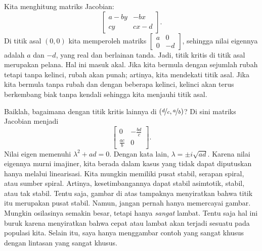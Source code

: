 Kita menghitung matriks Jacobian:
\begin{equation*}
\begin{bmatrix}
a-by & -bx \\
cy & cx-d
\end{bmatrix} .
\end{equation*}
Di titik asal $(0,0)$ kita memperoleh matriks
$\left[ \begin{smallmatrix}
a & 0 \\
0 & -d
\end{smallmatrix} \right]$, sehingga nilai eigennya adalah $a$ dan $-d$,
yang real dan berlainan tanda. Jadi, titik kritis di titik asal merupakan
pelana. Hal ini masuk akal. Jika kita bermula dengan sejumlah rubah tetapi
tanpa kelinci, rubah akan punah; artinya, kita mendekati titik asal.
Jika kita bermula tanpa rubah dan dengan beberapa kelinci, kelinci akan terus
berkembang biak tanpa kendali sehingga kita menjauhi titik asal.

Baiklah\@, bagaimana dengan titik kritis lainnya di
$(\nicefrac{d}{c},\nicefrac{a}{b})$? Di sini matriks Jacobian menjadi
\begin{equation*}
\begin{bmatrix}
0 & -\frac{bd}{c} \\
\frac{ac}{b} & 0
\end{bmatrix} .
\end{equation*}
Nilai eigen memenuhi $\lambda^2 + ad = 0$. Dengan kata lain,
$\lambda = \pm i \sqrt{ad}$. Karena nilai eigennya murni imajiner, kita
berada dalam kasus yang tidak dapat diputuskan hanya melalui linearisasi.
Kita mungkin memiliki pusat stabil, serapan spiral, atau sumber spiral.
Artinya, kesetimbangannya dapat stabil asimtotik, stabil, atau tak stabil.
Tentu saja, gambar di atas tampaknya menyiratkan bahwa titik itu merupakan
pusat stabil. Namun, jangan pernah hanya memercayai gambar. Mungkin
osilasinya semakin besar, tetapi hanya \emph{sangat} lambat. Tentu saja hal
ini buruk karena menyiratkan bahwa cepat atau lambat akan terjadi sesuatu
pada populasi kita. Selain itu, saya hanya menggambar contoh yang sangat
khusus dengan lintasan yang sangat khusus.

